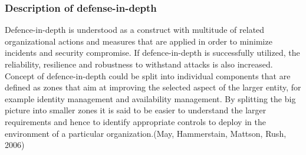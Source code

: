 \documentclass{article}
\begin{document}
\subsubsection{Description of defense-in-depth}
Defence-in-depth is understood as a construct with multitude of related organizational actions and measures that are applied in order to minimize incidents and security compromise. If defence-in-depth is successfully utilized, the reliability, resilience and robustness to withstand attacks is also increased. Concept of defence-in-depth could be split into individual components that are defined as zones that aim at improving the selected aspect of the larger entity, for example identity management and availability management. By splitting the big picture into smaller zones it is said to be easier to understand the larger requirements and hence to identify appropriate controls to deploy in the environment of a particular organization.(May, Hammerstain, Mattson, Rush, 2006)
\end{document}
